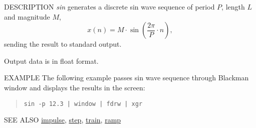 \begin{synopsis}
\item[sin] [ --l $L$ ] [ --p $P$ ] [ --m $M$ ]
\end{synopsis}

\begin{qsection}{DESCRIPTION}
{\em sin} generates a discrete sin wave sequence 
of period $P$, length $L$ and magnitude $M$, 
\begin{displaymath}
  x(n) = M \cdot \sin \left( \frac{2\pi}{P} \cdot n \right), 
\end{displaymath}
sending the result to standard output.

Output data is in float format.
\end{qsection}

\begin{options}
\end{options}

\begin{qsection}{EXAMPLE}
The following example passes sin wave sequence through
Blackman window and displays the results in the screen:
\begin{quote}
\verb!sin -p 12.3 | window | fdrw | xgr!
\end{quote}
\end{qsection}

\begin{qsection}{SEE ALSO}
\hyperlink{impulse}{impulse},
\hyperlink{step}{step},
\hyperlink{train}{train},
\hyperlink{ramp}{ramp}
\end{qsection}
